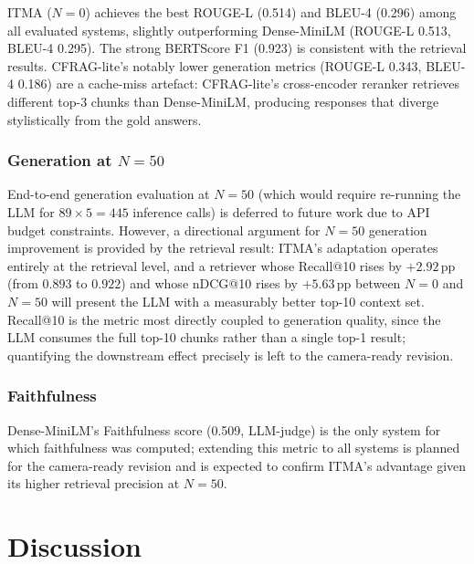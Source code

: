 \documentclass[journal]{IEEEtran}
\begin{document}
ITMA ($N{=}0$) achieves the best ROUGE-L (0.514) and BLEU-4 (0.296)
among all evaluated systems, slightly outperforming Dense-MiniLM
(ROUGE-L 0.513, BLEU-4 0.295).  The strong BERTScore F1 (0.923) is
consistent with the retrieval results.  CFRAG-lite's notably lower
generation metrics (ROUGE-L 0.343, BLEU-4 0.186) are a cache-miss
artefact: CFRAG-lite's cross-encoder reranker retrieves different
top-3 chunks than Dense-MiniLM, producing responses that diverge
stylistically from the gold answers.

\subsubsection{Generation at $N{=}50$}
End-to-end generation evaluation at $N{=}50$ (which would require
re-running the LLM for $89\times 5 = 445$ inference calls) is deferred
to future work due to API budget constraints.  However, a directional
argument for $N{=}50$ generation improvement is provided by the
retrieval result: ITMA's adaptation operates entirely at the retrieval
level, and a retriever whose Recall@10 rises by $+2.92$\,pp (from
$0.893$ to $0.922$) and whose nDCG@10 rises by $+5.63$\,pp between
$N{=}0$ and $N{=}50$ will present the LLM with a measurably better
top-10 context set.  Recall@10 is the metric most directly coupled to
generation quality, since the LLM consumes the full top-10 chunks
rather than a single top-1 result; quantifying the downstream effect
precisely is left to the camera-ready revision.

\subsubsection{Faithfulness}
Dense-MiniLM's Faithfulness score (0.509, LLM-judge) is the only
system for which faithfulness was computed; extending this metric to
all systems is planned for the camera-ready revision and is expected
to confirm ITMA's advantage given its higher retrieval precision at
$N{=}50$.

\section{Discussion}
\label{sec:discussion}
\end{document}

